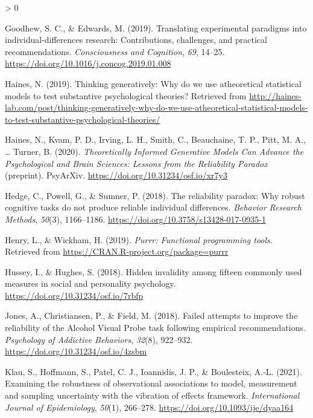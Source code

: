\documentclass[
  english,
  man,floatsintext]{apa6}
\newlength{\cslhangindent}
\newenvironment{CSLReferences}[2] %
 {%
  \setlength{\parindent}{0pt}
  \ifodd #1 \everypar{\setlength{\hangindent}{\cslhangindent}}\ignorespaces\fi
  \ifnum #2 > 0
  \setlength{\parskip}{#2\baselineskip}
  \fi
 }%
 {}
\begin{document}
\begin{CSLReferences}{1}{0}
\leavevmode\hypertarget{ref-goodhew_translating_2019}{}%
Goodhew, S. C., \& Edwards, M. (2019). Translating experimental paradigms into individual-differences research: {Contributions}, challenges, and practical recommendations. \emph{Consciousness and Cognition}, \emph{69}, 14--25. \url{https://doi.org/10.1016/j.concog.2019.01.008}

\leavevmode\hypertarget{ref-haines_thinking_2019}{}%
Haines, N. (2019). Thinking generatively: {Why} do we use atheoretical statistical models to test substantive psychological theories? Retrieved from \url{http://haines-lab.com/post/thinking-generatively-why-do-we-use-atheoretical-statistical-models-to-test-substantive-psychological-theories/}

\leavevmode\hypertarget{ref-haines_theoretically_2020}{}%
Haines, N., Kvam, P. D., Irving, L. H., Smith, C., Beauchaine, T. P., Pitt, M. A., \ldots{} Turner, B. (2020). \emph{Theoretically {Informed} {Generative} {Models} {Can} {Advance} the {Psychological} and {Brain} {Sciences}: {Lessons} from the {Reliability} {Paradox}} (preprint). PsyArXiv. \url{https://doi.org/10.31234/osf.io/xr7y3}

\leavevmode\hypertarget{ref-hedge_reliability_2018}{}%
Hedge, C., Powell, G., \& Sumner, P. (2018). The reliability paradox: {Why} robust cognitive tasks do not produce reliable individual differences. \emph{Behavior Research Methods}, \emph{50}(3), 1166--1186. \url{https://doi.org/10.3758/s13428-017-0935-1}

\leavevmode\hypertarget{ref-R-purrr}{}%
Henry, L., \& Wickham, H. (2019). \emph{Purrr: Functional programming tools}. Retrieved from \url{https://CRAN.R-project.org/package=purrr}

\leavevmode\hypertarget{ref-hussey_hidden_2018}{}%
Hussey, I., \& Hughes, S. (2018). Hidden invalidity among fifteen commonly used measures in social and personality psychology. \url{https://doi.org/10.31234/osf.io/7rbfp}

\leavevmode\hypertarget{ref-jones_failed_2018-1}{}%
Jones, A., Christiansen, P., \& Field, M. (2018). Failed attempts to improve the reliability of the {Alcohol} {Visual} {Probe} task following empirical recommendations. \emph{Psychology of Addictive Behaviors}, \emph{32}(8), 922--932. \url{https://doi.org/10.31234/osf.io/4zsbm}

\leavevmode\hypertarget{ref-klau_examining_2021}{}%
Klau, S., Hoffmann, S., Patel, C. J., Ioannidis, J. P., \& Boulesteix, A.-L. (2021). Examining the robustness of observational associations to model, measurement and sampling uncertainty with the vibration of effects framework. \emph{International Journal of Epidemiology}, \emph{50}(1), 266--278. \url{https://doi.org/10.1093/ije/dyaa164}


\end{CSLReferences}
\end{document}
